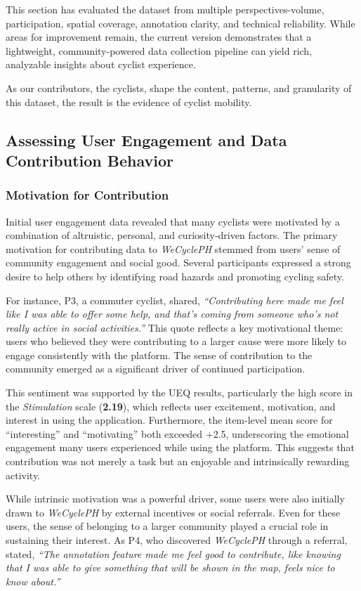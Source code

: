 This section has evaluated the dataset from multiple perspectives-volume, participation, spatial coverage, annotation clarity, and technical reliability. While areas for improvement remain, the current version demonstrates that a lightweight, community-powered data collection pipeline can yield rich, analyzable insights about cyclist experience.

As our contributors, the cyclists, shape the content, patterns, and granularity of this dataset, the result is the evidence of cyclist mobility.

\subsection{Assessing User Engagement and Data Contribution Behavior}

\subsubsection{Motivation for Contribution}
Initial user engagement data revealed that many cyclists were motivated by a combination of altruistic, personal, and curiosity-driven factors. The primary motivation for contributing data to \textit{WeCyclePH} stemmed from users' sense of community engagement and social good. Several participants expressed a strong desire to help others by identifying road hazards and promoting cycling safety. 

For instance, P3, a commuter cyclist, shared, \textit{``Contributing here made me feel like I was able to offer some help, and that's coming from someone who's not really active in social activities.''} This quote reflects a key motivational theme: users who believed they were contributing to a larger cause were more likely to engage consistently with the platform. The sense of contribution to the community emerged as a significant driver of continued participation.

This sentiment was supported by the UEQ results, particularly the high score in the \textit{Stimulation} scale (\textbf{2.19}), which reflects user excitement, motivation, and interest in using the application. Furthermore, the item-level mean score for ``interesting'' and ``motivating'' both exceeded +2.5, underscoring the emotional engagement many users experienced while using the platform. This suggests that contribution was not merely a task but an enjoyable and intrinsically rewarding activity.

While intrinsic motivation was a powerful driver, some users were also initially drawn to \textit{WeCyclePH} by external incentives or social referrals. Even for these users, the sense of belonging to a larger community played a crucial role in sustaining their interest. As P4, who discovered \textit{WeCyclePH} through a referral, stated, \textit{``The annotation feature made me feel good to contribute, like knowing that I was able to give something that will be shown in the map, feels nice to know about.''} 

